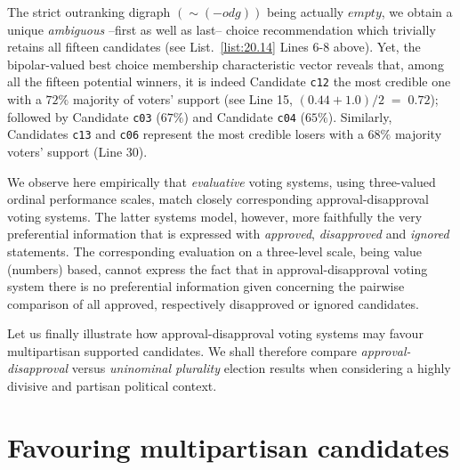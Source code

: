 The strict outranking digraph $(\sim (-odg))$ being actually $empty$, we obtain a unique \emph{ambiguous} --first as well as last-- choice recommendation which trivially retains all fifteen candidates (see List.~\vref{list:20.14} Lines 6-8 above). Yet, the bipolar-valued best choice membership characteristic vector reveals that, among all the fifteen potential winners, it is indeed Candidate \texttt{c12} the most credible one with a $72\%$ majority of voters' support (see Line 15, $(0.44 + 1.0)/2\;=\; 0.72$); followed by Candidate \texttt{c03} ($67\%$) and Candidate \texttt{c04} ($65\%$). Similarly, Candidates \texttt{c13} and \texttt{c06} represent the most credible losers with a $68\%$ majority voters' support (Line 30).

We observe here empirically that \emph{evaluative} voting systems, using three-valued ordinal performance scales, match closely corresponding approval-disapproval voting systems. The latter systems model, however, more faithfully the very preferential information that is expressed with \emph{approved}, \emph{disapproved} and \emph{ignored} statements. The corresponding evaluation on a three-level scale, being value (numbers) based, cannot express the fact that in approval-disapproval voting system there is no preferential information given concerning the pairwise comparison of all approved, respectively disapproved or ignored candidates.

Let us finally illustrate how approval-disapproval voting systems may favour multipartisan supported candidates. We shall therefore compare \emph{approval-disapproval} versus \emph{uninominal plurality} election results when considering a highly divisive and partisan political context.
 
\section{Favouring multipartisan candidates}
\label{sec:20.5}

